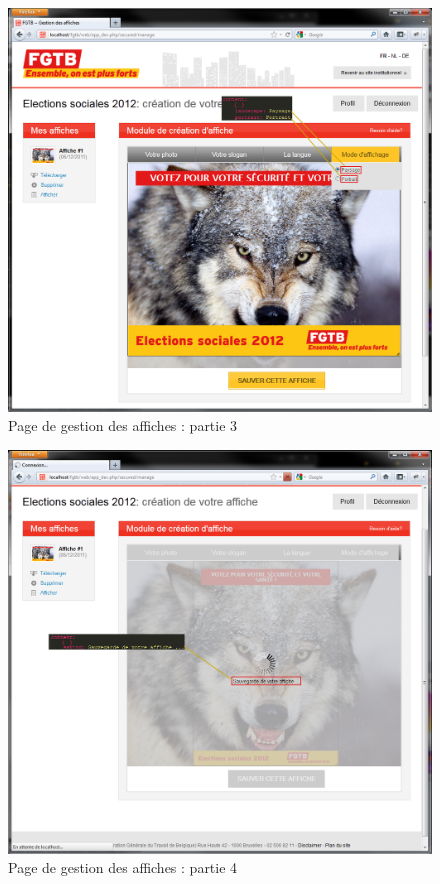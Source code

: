 \documentclass{article}
\begin{document}
\begin{sffamily}
\begin{figure}[!h]
\includegraphics[angle=-90,width=\textwidth]{messages_manage_step3.png}
\caption{Page de gestion des affiches : partie 3}
\end{figure}

\begin{figure}[!h]
\includegraphics[angle=-90,width=\textwidth]{messages_manage_step4.png}
\caption{Page de gestion des affiches : partie 4}
\end{figure}


\end{sffamily}
\end{document}
